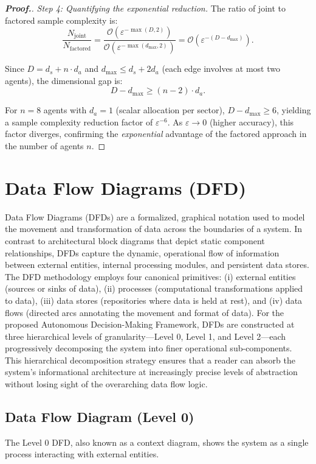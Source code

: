\documentclass[12pt,a4paper,oneside]{report}
\theoremstyle{definition}
\theoremstyle{remark}
\begin{document}
\begin{proof}[\textbf{Proof.}]
\medskip
\noindent\textit{Step 4: Quantifying the exponential reduction.}
The ratio of joint to factored sample complexity is:
\[
\frac{N_{\text{joint}}}{N_{\text{factored}}} = \frac{\mathcal{O}(\varepsilon^{-\max(D, 2)})}{\mathcal{O}(\varepsilon^{-\max(d_{\text{max}}, 2)})} = \mathcal{O}\left(\varepsilon^{-(D - d_{\text{max}})}\right).
\]

Since $D = d_s + n \cdot d_a$ and $d_{\text{max}} \leq d_s + 2d_a$ (each edge involves at most two agents), the dimensional gap is:
\[
D - d_{\text{max}} \geq (n - 2) \cdot d_a.
\]

For $n = 8$ agents with $d_a = 1$ (scalar allocation per sector), $D - d_{\text{max}} \geq 6$, yielding a sample complexity reduction factor of $\varepsilon^{-6}$. As $\varepsilon \to 0$ (higher accuracy), this factor diverges, confirming the \emph{exponential} advantage of the factored approach in the number of agents $n$.
\end{proof}

\section{Data Flow Diagrams (DFD)}

Data Flow Diagrams (DFDs) are a formalized, graphical notation used to model the movement and transformation of data across the boundaries of a system. In contrast to architectural block diagrams that depict static component relationships, DFDs capture the dynamic, operational flow of information between external entities, internal processing modules, and persistent data stores. The DFD methodology employs four canonical primitives: (i) external entities (sources or sinks of data), (ii) processes (computational transformations applied to data), (iii) data stores (repositories where data is held at rest), and (iv) data flows (directed arcs annotating the movement and format of data). For the proposed Autonomous Decision-Making Framework, DFDs are constructed at three hierarchical levels of granularity---Level 0, Level 1, and Level 2---each progressively decomposing the system into finer operational sub-components. This hierarchical decomposition strategy ensures that a reader can absorb the system's informational architecture at increasingly precise levels of abstraction without losing sight of the overarching data flow logic.

\subsection{Data Flow Diagram (Level 0)}
The Level 0 DFD, also known as a context diagram, shows the system as a single process interacting with external entities.
\end{document}
